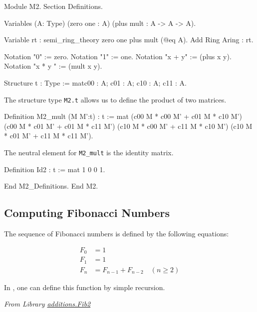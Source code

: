 \begin{Coqsrc}
Module M2.
Section Definitions.
  
  Variables (A: Type) (zero one : A)  (plus mult  : A -> A -> A).
  
  Variable rt : semi_ring_theory  zero one plus mult   (@eq A).
  Add Ring Aring : rt.

  Notation "0" := zero.  
  Notation "1" := one.
  Notation "x + y" := (plus x y).  
  Notation "x * y " := (mult x y).
  
  Structure t : Type := mat{c00 : A;  c01 : A;  c10 : A;  c11 : A}.
\end{Coqsrc}


The structure type \texttt{M2.t} allows us to define the product
of two matrices. 


\begin{Coqsrc}
Definition M2_mult (M M':t) : t := mat
  (c00 M * c00 M' + c01 M * c10 M') (c00 M * c01 M' + c01 M * c11 M')
  (c10 M * c00 M' + c11 M * c10 M') (c10 M * c01 M' + c11 M * c11 M').
\end{Coqsrc}

The neutral element for \texttt{M2\_mult} is the identity matrix.

\begin{Coqsrc}
Definition Id2 : t := mat 1 0 0 1.

End M2_Definitions.
End M2.
\end{Coqsrc}

\subsection{Computing Fibonacci Numbers}

The sequence of Fibonacci numbers is defined by the following equations:

\begin{align}
F_0 & = 1 \\
F_1 & = 1 \\
F_n & = F_{n-1} + F_{n-2} \quad (n \geq 2)
\end{align}


In \coq{}, one can define this function by simple recursion.

\emph{From Library
\href{../theories/html/hydras.additions.Fib2.html}{additions.Fib2}}

